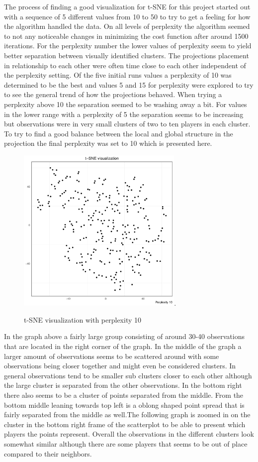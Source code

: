 \documentclass{article}
\begin{document}
The process of finding a good visualization for t-SNE for this project started out with a sequence of 5 different values from 10 to 50 to try to get a feeling for how the algorithm handled the data. On all levels of perplexity the algorithm seemed to not any noticeable changes in minimizing the cost function after around 1500 iterations. For the perplexity number the lower values of perplexity seem to yield better separation between visually identified clusters. The projections placement in relationship to each other were often time close to each other independent of the perplexity setting. Of the five initial runs values a perplexity of 10 was determined to be the best and values 5 and 15 for perplexity were explored to try to see the general trend of how the projections behaved. When trying a perplexity above 10 the separation seemed to be washing away a bit. For values in the lower range with a perplexity of 5 the separation seems to be increasing but observations were in very small clusters of two to ten players in each cluster. To try to find a good balance between the local and global structure in the projection the final perplexity was set to 10 which is presented here.

\begin{figure}[H]
 \centering
 \includegraphics[height=8cm]{tsne10}.
 \caption{t-SNE visualization with perplexity 10}
 \label{figure:1}
\end{figure}

In the graph above a fairly large group consisting of around 30-40 observations that are located in the right corner of the graph. In the middle of the graph a larger amount of observations seems to be scattered around with some observations being closer together and might even be considered clusters. In general observations tend to be smaller sub clusters closer to each other although the large cluster is separated from the other observations. In the bottom right there also seems to be a cluster of points separated from the middle. From the bottom middle leaning towards top left is a oblong shaped point spread that is fairly separated from the middle as well.The following graph is zoomed in on the cluster in the bottom right frame of the scatterplot to be able to present which players the points represent. Overall the observations in the different clusters look somewhat similar although there are some players that seems to be out of place compared to their neighbors.
\end{document}
